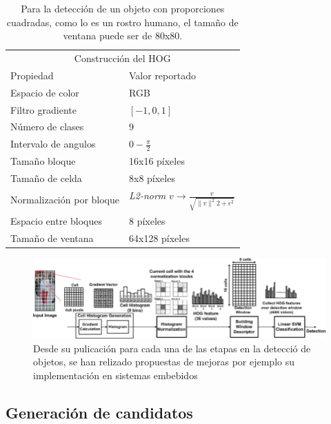 \documentclass{article}
\begin{document}
\begin{table}
\centering
\begin{tabular}{ |p{5cm}||p{5cm}| }
\hline
\multicolumn{2}{|c|}{Construcción del HOG}\\
Propiedad & Valor reportado\\
\hline
Espacio de color & RGB \\
Filtro gradiente & \( [-1,0,1] \) \\
Número de clases & 9 \\
Intervalo de angulos & \( 0 - \frac{\pi}{2}\)\\
Tamaño bloque & 16x16 píxeles \\
Tamaño de celda & 8x8 píxeles \\
Normalización por bloque & \textit{L2-norm} \(v \to \frac{v}{\sqrt{\|v\|^{2}{2} + \epsilon^{2}} } \) \\
{Espacio entre bloques} & 8 píxeles \\
{Tamaño de ventana} & 64x128 píxeles \\
\hline
\end{tabular}
\caption{Para la detección de un objeto con proporciones cuadradas, como lo es un rostro humano, el tamaño de ventana puede ser de 80x80.}
\label{table:1}
\end{table}


\begin{figure}
\centering
\includegraphics[width=\textwidth]{HOG-features.png}
\caption{Desde su pulicación para cada una de las etapas en la detecció de objetos, se han relizado propuestas de mejoras por ejemplo su implementación en sistemas embebidos \cite{energy-hog}}
\label{fig:hog}
\end{figure}



\subsection*{Generación de candidatos}
\end{document}
